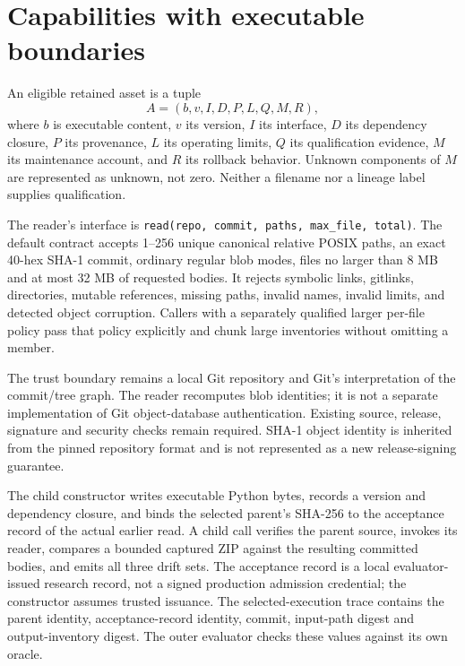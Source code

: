 \documentclass[11pt,a4paper]{article}
\newcommand{\code}[1]{\texttt{\small #1}}
\begin{document}
\section{Capabilities with executable boundaries}
\label{sec:assets}

An eligible retained asset is a tuple
\begin{equation}
  A=(b,v,I,D,P,L,Q,M,R),
\end{equation}
where $b$ is executable content, $v$ its version, $I$ its interface, $D$ its dependency closure, $P$ its provenance, $L$ its operating limits, $Q$ its qualification evidence, $M$ its maintenance account, and $R$ its rollback behavior. Unknown components of $M$ are represented as unknown, not zero. Neither a filename nor a lineage label supplies qualification.

The reader's interface is \code{read(repo, commit, paths, max\_file, total)}. The default contract accepts 1--256 unique canonical relative POSIX paths, an exact 40-hex SHA-1 commit, ordinary regular blob modes, files no larger than 8 MB and at most 32 MB of requested bodies. It rejects symbolic links, gitlinks, directories, mutable references, missing paths, invalid names, invalid limits, and detected object corruption. Callers with a separately qualified larger per-file policy pass that policy explicitly and chunk large inventories without omitting a member.

The trust boundary remains a local Git repository and Git's interpretation of the commit/tree graph. The reader recomputes blob identities; it is not a separate implementation of Git object-database authentication. Existing source, release, signature and security checks remain required. SHA-1 object identity is inherited from the pinned repository format and is not represented as a new release-signing guarantee.



The child constructor writes executable Python bytes, records a version and dependency closure, and binds the selected parent's SHA-256 to the acceptance record of the actual earlier read. A child call verifies the parent source, invokes its reader, compares a bounded captured ZIP against the resulting committed bodies, and emits all three drift sets. The acceptance record is a local evaluator-issued research record, not a signed production admission credential; the constructor assumes trusted issuance. The selected-execution trace contains the parent identity, acceptance-record identity, commit, input-path digest and output-inventory digest. The outer evaluator checks these values against its own oracle.
\end{document}
